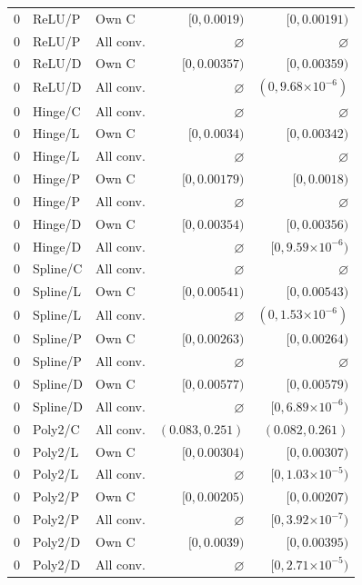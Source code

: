 \begin{longtable}{lllrr}
0 & ReLU/P & Own C & $[0, 0.0019)$ & $[0, 0.00191)$ \\
0 & ReLU/P & All conv. & $\varnothing$ & $\varnothing$ \\
0 & ReLU/D & Own C & $[0, 0.00357)$ & $[0, 0.00359)$ \\
0 & ReLU/D & All conv. & $\varnothing$ & $(0, 9.68\mathord{\times}10^{-6})$ \\
0 & Hinge/C & All conv. & $\varnothing$ & $\varnothing$ \\
0 & Hinge/L & Own C & $[0, 0.0034)$ & $[0, 0.00342)$ \\
0 & Hinge/L & All conv. & $\varnothing$ & $\varnothing$ \\
0 & Hinge/P & Own C & $[0, 0.00179)$ & $[0, 0.0018)$ \\
0 & Hinge/P & All conv. & $\varnothing$ & $\varnothing$ \\
0 & Hinge/D & Own C & $[0, 0.00354)$ & $[0, 0.00356)$ \\
0 & Hinge/D & All conv. & $\varnothing$ & $[0, 9.59\mathord{\times}10^{-6})$ \\
0 & Spline/C & All conv. & $\varnothing$ & $\varnothing$ \\
0 & Spline/L & Own C & $[0, 0.00541)$ & $[0, 0.00543)$ \\
0 & Spline/L & All conv. & $\varnothing$ & $(0, 1.53\mathord{\times}10^{-6})$ \\
0 & Spline/P & Own C & $[0, 0.00263)$ & $[0, 0.00264)$ \\
0 & Spline/P & All conv. & $\varnothing$ & $\varnothing$ \\
0 & Spline/D & Own C & $[0, 0.00577)$ & $[0, 0.00579)$ \\
0 & Spline/D & All conv. & $\varnothing$ & $[0, 6.89\mathord{\times}10^{-6})$ \\
0 & Poly2/C & All conv. & $(0.083, 0.251)$ & $(0.082, 0.261)$ \\
0 & Poly2/L & Own C & $[0, 0.00304)$ & $[0, 0.00307)$ \\
0 & Poly2/L & All conv. & $\varnothing$ & $[0, 1.03\mathord{\times}10^{-5})$ \\
0 & Poly2/P & Own C & $[0, 0.00205)$ & $[0, 0.00207)$ \\
0 & Poly2/P & All conv. & $\varnothing$ & $[0, 3.92\mathord{\times}10^{-7})$ \\
0 & Poly2/D & Own C & $[0, 0.0039)$ & $[0, 0.00395)$ \\
0 & Poly2/D & All conv. & $\varnothing$ & $[0, 2.71\mathord{\times}10^{-5})$ \\

\end{longtable}
